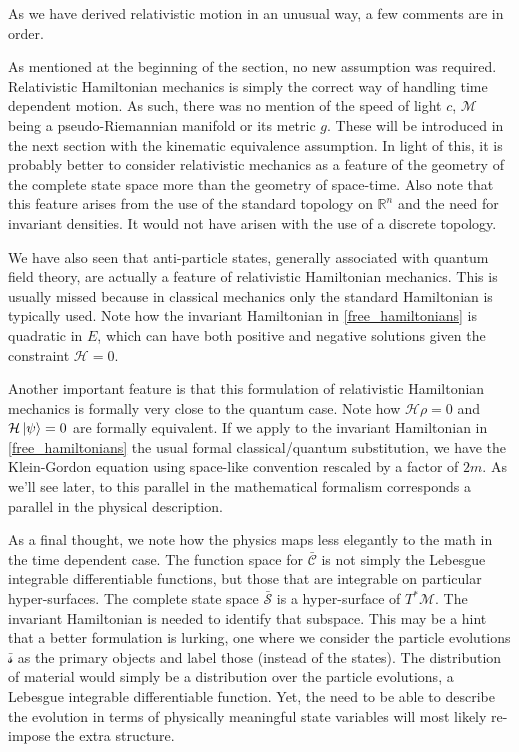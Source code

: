 \documentclass[smallextended]{svjour3}
\numberwithin{equation}{section}
\begin{document}
As we have derived relativistic motion in an unusual way, a few comments are in order.

As mentioned at the beginning of the section, no new assumption was required. Relativistic Hamiltonian mechanics is simply the correct way of handling time dependent motion. As such, there was no mention of the speed of light $c$, $\mathcal{M}$ being a pseudo-Riemannian manifold or its metric $g$. These will be introduced in the next section with the kinematic equivalence assumption. In light of this, it is probably better to consider relativistic mechanics as a feature of the geometry of the complete state space more than the geometry of space-time. Also note that this feature arises from the use of the standard topology on $\mathbb{R}^n$ and the need for invariant densities. It would not have arisen with the use of a discrete topology.

We have also seen that anti-particle states, generally associated with quantum field theory, are actually a feature of relativistic Hamiltonian mechanics. This is usually missed because in classical mechanics only the standard Hamiltonian is typically used. Note how the invariant Hamiltonian in \ref{free_hamiltonians} is quadratic in $E$, which can have both positive and negative solutions given the constraint $\mathcal{H}=0$.

Another important feature is that this formulation of relativistic Hamiltonian mechanics is formally very close to the quantum case. Note how $\mathcal{H} \rho = 0$ and $\mathcal{H} \ket{\psi} = 0$ are formally equivalent. If we apply to the invariant Hamiltonian in \ref{free_hamiltonians} the usual formal classical/quantum substitution, we have the Klein-Gordon equation using space-like convention rescaled by a factor of $2m$. As we'll see later, to this parallel in the mathematical formalism corresponds a parallel in the physical description.

As a final thought, we note how the physics maps less elegantly to the math in the time dependent case. The function space for $\bar{\mathcal{C}}$ is not simply the Lebesgue integrable differentiable functions, but those that are integrable on particular hyper-surfaces. The complete state space $\bar{\mathcal{S}}$ is a hyper-surface of $T^*\mathcal{M}$. The invariant Hamiltonian is needed to identify that subspace. This may be a hint that a better formulation is lurking, one where we consider the particle evolutions $\bar{\mathcal{s}}$ as the primary objects and label those (instead of the states). The distribution of material would simply be a distribution over the particle evolutions, a Lebesgue integrable differentiable function. Yet, the need to be able to describe the evolution in terms of physically meaningful state variables will most likely re-impose the extra structure.
\end{document}
